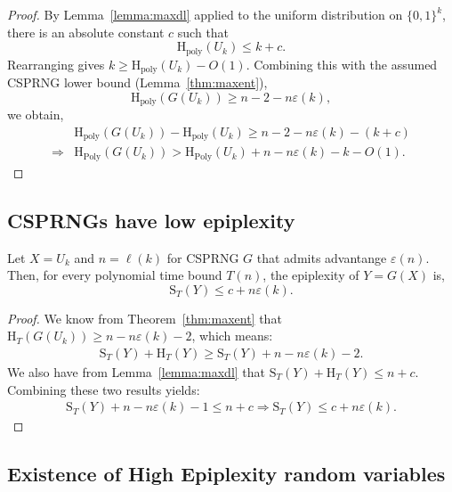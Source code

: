 \documentclass[twoside]{article}
\newcommand{\rH}{\mathrm{H}}
\newcommand{\rS}{\mathrm{S}}
\begin{document}
%
%
%
%
%
%

\begin{proof}
By Lemma~\ref{lemma:maxdl} applied to the uniform distribution on $\{0,1\}^k$,
there is an absolute constant $c$ such that
\[
\rH_{\mathrm{poly}}(U_k)\le k+c.
\]
Rearranging gives $k \ge \rH_{\mathrm{poly}}(U_k)-O(1)$.
Combining this with the assumed CSPRNG lower bound (Lemma~\ref{thm:maxent}),
\[
\rH_{\mathrm{poly}}(G(U_k)) \ge n-2-n\varepsilon(k),
\]
we obtain,
\begin{align*}
    &\rH_{\mathrm{poly}}(G(U_k)) - \rH_{\mathrm{poly}}(U_k) \geq n-2-n\varepsilon(k) - (k+c)\\
    \Rightarrow &\rH_{\mathrm{Poly}}(G(U_k))>\rH_{\mathrm{Poly}}(U_k) + n-n\varepsilon(k)-k - O(1).
\end{align*}
%
%
%
%
%
%
%
\end{proof}
\subsection{CSPRNGs have low epiplexity}
\label{sec:csprng-epi}
\begin{theorem}
    Let $X = U_k$ and $n = \ell(k)$ for CSPRNG $G$ that admits advantange $\varepsilon(n)$.
    Then, for every polynomial time bound $T(n)$, the epiplexity of $Y = G(X)$ is,
    \begin{equation}
        \rS_T(Y) \leq c + n\varepsilon(k).
    \end{equation}
\end{theorem}
\begin{proof}
    We know from Theorem~\ref{thm:maxent} that $\rH_T(G(U_k)) \geq n-n\varepsilon(k) -2$, which means:
    \begin{align}
        \rS_T(Y) + \rH_T(Y) \geq \rS_T(Y) + n - n\varepsilon(k) - 2.
    \end{align}
    We also have from Lemma~\ref{lemma:maxdl} that $\rS_T(Y) + \rH_T(Y) \leq n + c$. Combining these two results yields:
    \begin{align}
        \rS_T(Y) + n - n\varepsilon(k)-1 \leq n +c 
        \Rightarrow \rS_T(Y) \leq c + n \varepsilon(k).
    \end{align}
\end{proof}

\subsection{Existence of High Epiplexity random variables}
\label{app:high-ep}
\end{document}
